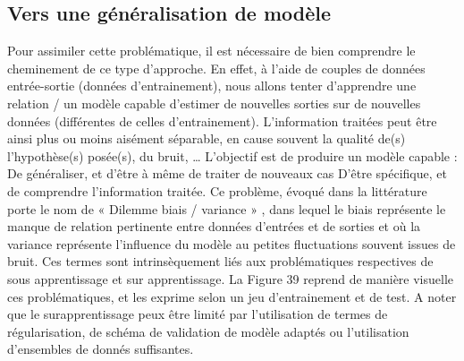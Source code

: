 \subsection{Vers une généralisation de modèle}
Pour assimiler cette problématique, il est nécessaire de bien comprendre le cheminement de ce type d’approche. En effet, à l’aide de couples de données entrée-sortie (données d’entrainement), nous allons tenter d’apprendre une relation / un modèle capable d’estimer de nouvelles sorties sur de nouvelles données (différentes de celles d’entrainement). 
L’information traitées peut être ainsi plus ou moins aisément séparable, en cause souvent la qualité de(s) l’hypothèse(s) posée(s), du bruit, … L’objectif est de produire un modèle capable :
	De généraliser, et d’être à même de traiter de nouveaux cas 
	D’être spécifique, et de comprendre l’information traitée.
Ce problème, évoqué dans la littérature porte le nom de « Dilemme biais / variance » , dans lequel le biais représente le manque de relation pertinente entre données d’entrées et de sorties et où la variance représente l’influence du modèle au petites fluctuations souvent issues de bruit. Ces termes sont intrinsèquement liés aux problématiques respectives de sous apprentissage et sur apprentissage. La Figure 39 reprend de manière visuelle ces problématiques, et les exprime selon un jeu d’entrainement et de test. A noter que le surapprentissage peux être limité par l’utilisation de termes de régularisation, de schéma de validation de modèle adaptés ou l’utilisation d’ensembles de donnés suffisantes. 
 

